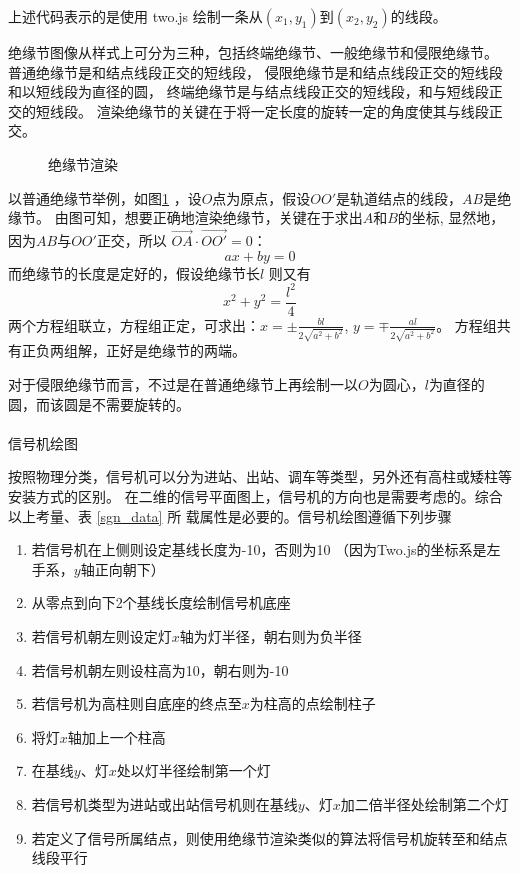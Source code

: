 上述代码表示的是使用 two.js 绘制一条从$(x_1, y_1)$到$(x_2, y_2)$的线段\cite{twojs}。

绝缘节图像从样式上可分为三种，包括终端绝缘节、一般绝缘节和侵限绝缘节。
普通绝缘节是和结点线段正交的短线段，
侵限绝缘节是和结点线段正交的短线段和以短线段为直径的圆，
终端绝缘节是与结点线段正交的短线段，和与短线段正交的短线段。
渲染绝缘节的关键在于将一定长度的旋转一定的角度使其与线段正交。

\begin{figure}[ht]
  \centering
  
  \caption{\label{node}绝缘节渲染}
\end{figure}

以普通绝缘节举例，如图\ref{node} ，设$O$点为原点，假设$OO'$是轨道结点的线段，$AB$是绝缘节。
由图可知，想要正确地渲染绝缘节，关键在于求出$A$和$B$的坐标,
显然地，因为$AB$与$OO'$正交，所以 $\overrightarrow {OA} \cdot \overrightarrow {OO'} = 0$：
$$ax + by = 0$$
而绝缘节的长度是定好的，假设绝缘节长$l$ 则又有
$$x^2 + y^2 = \frac{l^2}{4}$$
两个方程组联立，方程组正定，可求出：$\displaystyle x = \pm \frac{bl}{2\sqrt{a^2+b^2}}$,
$\displaystyle y = \mp \frac{al}{2\sqrt{a^2+b^2}}$。
方程组共有正负两组解，正好是绝缘节的两端。

对于侵限绝缘节而言，不过是在普通绝缘节上再绘制一以$O$为圆心，$l$为直径的圆，而该圆是不需要旋转的。

\paragraph{}信号机绘图

按照物理分类，信号机可以分为进站、出站、调车等类型，另外还有高柱或矮柱等安装方式的区别。
在二维的信号平面图上，信号机的方向也是需要考虑的。综合以上考量、表 \ref{sgn_data} 所
载属性是必要的。信号机绘图遵循下列步骤
\begin{enumerate}[\indent i.]
  \item 若信号机在上侧则设定基线长度为-10，否则为10 （因为Two.js的坐标系是左手系，$y$轴正向朝下）
  \item 从零点到向下2个基线长度绘制信号机底座
  \item 若信号机朝左则设定灯$x$轴为灯半径，朝右则为负半径
  \item 若信号机朝左则设柱高为10，朝右则为-10
  \item 若信号机为高柱则自底座的终点至$x$为柱高的点绘制柱子
  \item 将灯$x$轴加上一个柱高
  \item 在基线$y$、灯$x$处以灯半径绘制第一个灯
  \item 若信号机类型为进站或出站信号机则在基线$y$、灯$x$加二倍半径处绘制第二个灯
  \item 若定义了信号所属结点，则使用绝缘节渲染类似的算法将信号机旋转至和结点线段平行
\end{enumerate}

